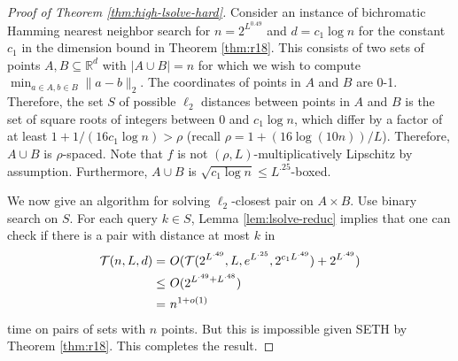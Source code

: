 \begin{proof}[Proof of Theorem \ref{thm:high-lsolve-hard}]
Consider an instance of bichromatic Hamming nearest neighbor search for $n = 2^{L^{0.49}}$ and $d = c_1\log n$ for the constant $c_1$ in the dimension bound in Theorem \ref{thm:r18}. This consists of two sets of points $A,B\subseteq \mathbb{R}^d$ with $|A\cup B| = n$ for which we wish to compute $\min_{a\in A, b\in B} \|a - b\|_2$. The coordinates of points in $A$ and $B$ are 0-1. Therefore, the set $S$ of possible $\ell_2$ distances between points in $A$ and $B$ is the set of square roots of integers between 0 and $c_1\log n$, which differ by a factor of at least $1 + 1/(16c_1\log n) > \rho$ (recall $\rho = 1 + (16\log (10n))/L$). Therefore, $A\cup B$ is $\rho$-spaced. Note that $f$ is not $(\rho,L)$-multiplicatively Lipschitz by assumption. Furthermore, $A\cup B$ is $\sqrt{c_1\log n}\le L^{.25}$-boxed.

We now give an algorithm for solving $\ell_2$-closest pair on $A\times B$. Use binary search on $S$. For each query $k\in S$, Lemma \ref{lem:lsolve-reduc} implies that one can check if there is a pair with distance at most $k$ in 
\begin{align*}
\mathcal{T}(n,L,d)
= & ~ O(\mathcal{T}(2^{L^{.49}},L,e^{L^{.25}},2^{c_1 L^{.49}}) + 2^{L^{.49}}) \\
\le & ~ O(2^{L^{.49} + L^{.48}}) \\ 
= & ~ n^{1 + o(1)}
\end{align*}
time on pairs of sets with $n$ points. But this is impossible given {\sf SETH} by Theorem \ref{thm:r18}. This completes the result.
\end{proof}
